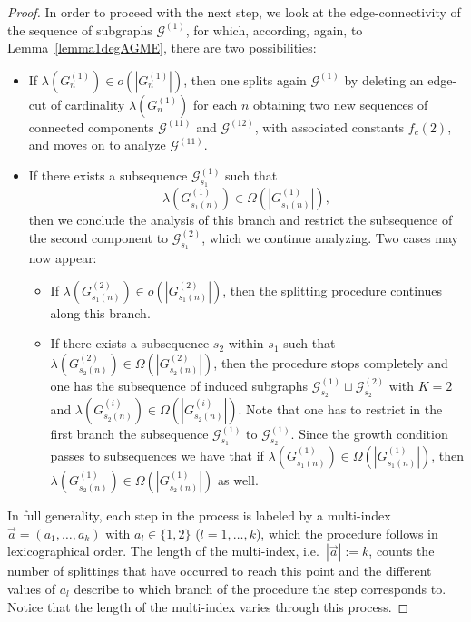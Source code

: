 \documentclass[a4paper,onecolumn,accepted=2024-12-14]{quantumarticle}
\theoremstyle{plain}
\newcommand{\cG}{{\mathcal G}}         %
\begin{document}
\begin{proof}
In order to proceed with the next step, we look at the edge-connectivity of the sequence of subgraphs $\cG^{(1)}$, for which, according, again, to Lemma~\ref{lemma1degAGME}, there are two possibilities:
\begin{itemize}
   \item [a)]
   If $\lambda(G_{n}^{(1)})\in o(|G_{n}^{(1)}|)$, then one splits again $\cG^{(1)}$
   by deleting an edge-cut of cardinality $\lambda(G_{n}^{(1)})$ for each $n$ obtaining two new sequences of connected components $\cG^{(11)}$ and
   $\cG^{(12)}$, with associated constants $f_c(2)$,  and moves on to analyze $\cG^{(11)}$.
 \item [b)] If there exists a subsequence $\cG_{s_1}^{(1)}$ such that
 \begin{equation}
 \lambda\left(G_{s_1(n)}^{(1)}\right)\in\Omega \left(|G_{s_1(n)}^{(1)}|\right),
 \end{equation}
 then we conclude the analysis of this branch and restrict the subsequence of the second component to $\cG_{s_1}^{(2)}$, which we continue analyzing. Two cases may now appear:
 \begin{itemize}
  \item [a)] If $\lambda\left(G_{s_1(n)}^{(2)}\right)\in o\left(|G_{s_1(n)}^{(2)}|\right)$, then the splitting procedure continues along this branch.
  \item [b)] If there exists a subsequence $s_2$ within $s_1$ such that
  $\lambda\left(G_{s_2(n)}^{(2)}\right)\in\Omega \left(|G_{s_2(n)}^{(2)}|\right)$, then the procedure stops completely and one has the subsequence of induced subgraphs
  $\cG_{s_2}^{(1)}\sqcup \cG_{s_2}^{(2)}$ with $K=2$ and
  $\lambda\left(G_{s_2(n)}^{(i)}\right)\in\Omega \left(|G_{s_2(n)}^{(i)}|\right)$.
  Note that one has to restrict in the first branch the subsequence $\cG_{s_1}^{(1)}$ to $\cG_{s_2}^{(1)}$. Since the growth condition passes to subsequences we have that if
  $\lambda\left(G_{s_1(n)}^{(1)}\right)\in\Omega \left(|G_{s_1(n)}^{(1)}|\right)$, then
  $\lambda\left(G_{s_2(n)}^{(1)}\right)\in\Omega \left(|G_{s_2(n)}^{(1)}|\right)$ as well.
 \end{itemize}
\end{itemize}

In full generality, each step in the process is labeled by a multi-index $\vec{a}=(a_1,\dots,a_k)$ with $a_l\in\{1,2\}$ ($l=1,\dots,k$), which the procedure follows in lexicographical order. The length of the multi-index, i.e.\ $|\vec{a}|:=k$, counts the number of splittings that have occurred to reach this point and the different values of $a_l$ describe to which branch of the procedure the step corresponds to. Notice that the length of the multi-index varies through this process.


\end{proof}
\end{document}
